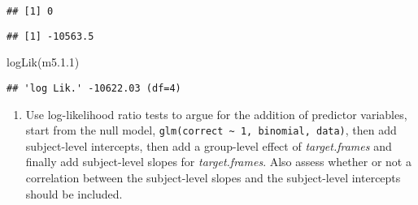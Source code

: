 \documentclass[
]{article}
\newenvironment{Shaded}{\begin{snugshade}}{\end{snugshade}}
\newcommand{\FloatTok}[1]{\textcolor[rgb]{0.00,0.00,0.81}{#1}}
\newcommand{\FunctionTok}[1]{\textcolor[rgb]{0.00,0.00,0.00}{#1}}
\newcommand{\NormalTok}[1]{#1}
\newcommand{\SpecialCharTok}[1]{\textcolor[rgb]{0.00,0.00,0.00}{#1}}
\providecommand{\tightlist}{%
  \setlength{\itemsep}{0pt}\setlength{\parskip}{0pt}}
\begin{document}
\begin{Shaded}
\end{Shaded}

\begin{verbatim}
## [1] 0
\end{verbatim}

\begin{Shaded}
\end{Shaded}

\begin{verbatim}
## [1] -10563.5
\end{verbatim}

\begin{Shaded}
\begin{Highlighting}[]
\FunctionTok{logLik}\NormalTok{(m5.}\FloatTok{1.1}\NormalTok{)}
\end{Highlighting}
\end{Shaded}

\begin{verbatim}
## 'log Lik.' -10622.03 (df=4)
\end{verbatim}

\begin{enumerate}
\def\labelenumi{\arabic{enumi})}
\setcounter{enumi}{1}
\tightlist
\item
  Use log-likelihood ratio tests to argue for the addition of predictor
  variables, start from the null model,
  \texttt{glm(correct\ \textasciitilde{}\ 1,\ \textquotesingle{}binomial\textquotesingle{},\ data)},
  then add subject-level intercepts, then add a group-level effect of
  \emph{target.frames} and finally add subject-level slopes for
  \emph{target.frames}. Also assess whether or not a correlation between
  the subject-level slopes and the subject-level intercepts should be
  included.
\end{enumerate}
\end{document}
